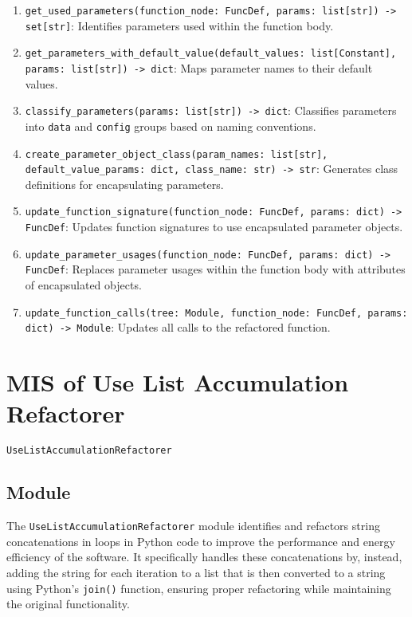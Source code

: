 \documentclass[12pt, titlepage]{article}
\begin{document}
\begin{enumerate}
\item \texttt{get\_used\_parameters(function\_node: FuncDef, params: list[str]) -> set[str]}: Identifies parameters used within the function body.
\item \texttt{get\_parameters\_with\_default\_value(default\_values: list[Constant], params: list[str]) -> dict}: Maps parameter names to their default values.
\item \texttt{classify\_parameters(params: list[str]) -> dict}: Classifies parameters into \texttt{data} and \texttt{config} groups based on naming conventions.
\item \texttt{create\_parameter\_object\_class(param\_names: list[str], default\_value\_params: dict, class\_name: str) -> str}: Generates class definitions for encapsulating parameters.
\item \texttt{update\_function\_signature(function\_node: FuncDef, params: dict) -> FuncDef}: Updates function signatures to use encapsulated parameter objects.
\item \texttt{update\_parameter\_usages(function\_node: FuncDef, params: dict) -> FuncDef}: Replaces parameter usages within the function body with attributes of encapsulated objects.
\item \texttt{update\_function\_calls(tree: Module, function\_node: FuncDef, params: dict) -> Module}: Updates all calls to the refactored function.
\end{enumerate}

\section{MIS of Use List Accumulation Refactorer} \label{mis:ListAccum}

\texttt{UseListAccumulationRefactorer}

\subsection{Module}

The \texttt{UseListAccumulationRefactorer} module identifies and refactors 
string concatenations in loops in Python code to improve the performance and energy efficiency of the software. It specifically handles these concatenations by, instead, adding the string for each iteration to a list that is then converted to a string using Python's \texttt{join()} function, ensuring proper refactoring while maintaining the original functionality.
\end{document}
